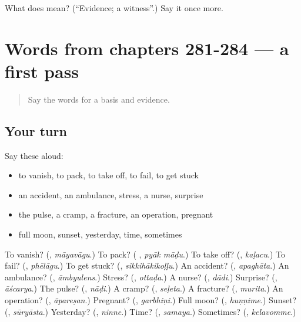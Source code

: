 \begin{tcolorbox}[breakable,colback=teal!4,colframe=teal!35!black,title={Before you move on}]
What does  mean? (\textquotedblleft{}Evidence; a witness\textquotedblright{}.) Say it once more.
\end{tcolorbox}
\section[(dialogue)]{Words from chapters 281-284 — a first pass}

\label{lesson:KA-R289-first-pass-words-from-chapters-281-284}



\begin{quote}
Say the words for a basis and evidence.
\end{quote}

\subsection*{Your turn}
Say these aloud:

\begin{itemize}
\raggedright
  \item to vanish, to pack, to take off, to fail, to get stuck
  \item an accident, an ambulance, stress, a nurse, surprise
  \item the pulse, a cramp, a fracture, an operation, pregnant
  \item full moon, sunset, yesterday, time, sometimes
\end{itemize}

\begin{tcolorbox}[breakable,colback=teal!4,colframe=teal!35!black,title={Before you move on}]
To vanish? (\textbf{}, \emph{māyavāgu}.) To pack? (\textbf{ }, \emph{pyāk māḍu}.) To take off? (\textbf{}, \emph{kaḷacu}.) To fail? (\textbf{}, \emph{phēlāgu}.) To get stuck? (\textbf{}, \emph{sikkihākikoḷḷu}.) An accident? (\textbf{}, \emph{apaghāta}.) An ambulance? (\textbf{}, \emph{āmbyulens}.) Stress? (\textbf{}, \emph{ottaḍa}.) A nurse? (\textbf{}, \emph{dādi}.) Surprise? (\textbf{}, \emph{āścarya}.) The pulse? (\textbf{}, \emph{nāḍi}.) A cramp? (\textbf{}, \emph{seḷeta}.) A fracture? (\textbf{}, \emph{murita}.) An operation? (\textbf{}, \emph{āpareṣan}.) Pregnant? (\textbf{}, \emph{garbhiṇi}.) Full moon? (\textbf{}, \emph{huṇṇime}.) Sunset? (\textbf{}, \emph{sūryāsta}.) Yesterday? (\textbf{}, \emph{ninne}.) Time? (\textbf{}, \emph{samaya}.) Sometimes? (\textbf{}, \emph{kelavomme}.)
\end{tcolorbox}

